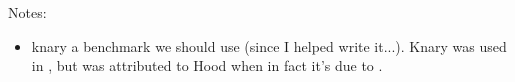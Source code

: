 \documentclass[pldi]{sigplanconf-pldi15}
\begin{document}
Notes: 
\begin{itemize}
\item knary a benchmark we should use (since I helped write
  it...).  Knary was used in \cite{SchneiderAnNi06}, but was
  attributed to Hood when in fact it's due to \cite{BlumofeJoKu96}.
\end{itemize}
\end{document}
